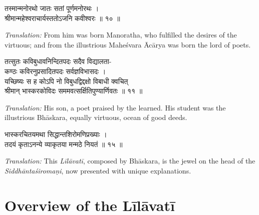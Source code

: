 \documentclass[10pt,a4paper]{article}
\newenvironment{sanskritverse}{%
  \begin{center}%
  \begin{minipage}{0.94\textwidth}%
  \centering\devanagarifont\small%
}{%
  \end{minipage}%
  \end{center}%
  \vspace{0.1em}%
}
\begin{document}
\begin{sanskritverse}
तस्मान्मनोरथो जातः सतां पूर्णमनोरथः ।\\
श्रीमान्महेश्वराचार्यस्ततोऽजनि कवीश्वरः ॥ १० ॥
\end{sanskritverse}
\textit{Translation:} From him was born Manoratha, who fulfilled the desires of the virtuous; and from the illustrious Maheśvara Ācārya was born the lord of poets.

\begin{sanskritverse}
तत्सुतः कविबुधावनिन्दितपदः सदैव विद्यालता-\\
कण्ठः कविरनुप्रसादितपदः सर्वज्ञविभासदः ।\\
यच्छिष्यः स ह कोऽपि नो विबुधद्विद्दक्षो विबाधी क्वचित्\\
श्रीमान् भास्करकोविदः सममवत्सर्क्षितिपुण्यार्णिवतः ॥ ११ ॥
\end{sanskritverse}
\textit{Translation:} His son, a poet praised by the learned. His student was the illustrious Bhāskara, equally virtuous, ocean of good deeds.

\begin{sanskritverse}
भास्करचितयमथा सिद्धान्तशिरोमणिप्रख्याः ।\\
तदयं कृताऽनन्ये व्याकृतया मन्मठे नियतं ॥ १५ ॥
\end{sanskritverse}
\textit{Translation:} This \textit{Līlāvatī}, composed by Bhāskara, is the jewel on the head of the \textit{Siddhāntaśiromaṇi}, now presented with unique explanations.

\tableofcontents

\newpage
\pagestyle{fancy}

\section*{Overview of the Līlāvatī}
\end{document}
